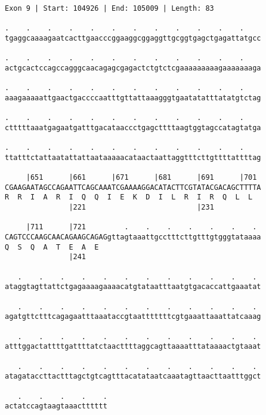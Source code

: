 \documentclass{article}
\begin{document}
\begin{Verbatim}[fontfamily=courier]
Exon 9 | Start: 104926 | End: 105009 | Length: 83

.    .    .    .    .    .    .    .    .    .    .    .    
tgaggcaaaagaatcacttgaacccggaaggcggaggttgcggtgagctgagattatgcc

.    .    .    .    .    .    .    .    .    .    .    .    
actgcactccagccagggcaacagagcgagactctgtctcgaaaaaaaaagaaaaaaaga

.    .    .    .    .    .    .    .    .    .    .    .    
aaagaaaaattgaactgaccccaatttgttattaaagggtgaatatatttatatgtctag

.    .    .    .    .    .    .    .    .    .    .    .    
ctttttaaatgagaatgatttgacataaccctgagcttttaagtggtagccatagtatga

.    .    .    .    .    .    .    .    .    .    .    .    
ttatttctattaatattattaataaaaacataactaattaggtttcttgttttattttag

     |651      |661      |671      |681      |691      |701 
CGAAGAATAGCCAGAATTCAGCAAATCGAAAAGGACATACTTCGTATACGACAGCTTTTA
R  R  I  A  R  I  Q  Q  I  E  K  D  I  L  R  I  R  Q  L  L  
               |221                          |231           

     |711      |721         .    .    .    .    .    .    . 
CAGTCCCAAGCAACAGAAGCAGAGgttagtaaattgcctttcttgtttgtgggtataaaa
Q  S  Q  A  T  E  A  E                                      
               |241                                         

   .    .    .    .    .    .    .    .    .    .    .    . 
ataggtagttattctgagaaaagaaaacatgtataatttaatgtgacaccattgaaatat

   .    .    .    .    .    .    .    .    .    .    .    . 
agatgttctttcagagaatttaaataccgtaatttttttcgtgaaattaaattatcaaag

   .    .    .    .    .    .    .    .    .    .    .    . 
atttggactattttgattttatctaacttttaggcagttaaaatttataaaactgtaaat

   .    .    .    .    .    .    .    .    .    .    .    . 
atagataccttactttagctgtcagtttacatataatcaaatagttaacttaatttggct

   .    .    .    .    .
actatccagtaagtaaactttttt
\end{Verbatim}
\newpage
\end{document}

